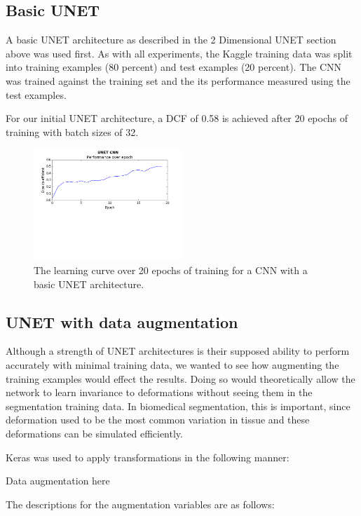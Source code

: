 \documentclass[letterpaper]{article}
\begin{document}
\subsection{Basic UNET}
A basic UNET architecture as described in the 2 Dimensional UNET section above was used first. As with all experiments, the Kaggle training data was split into training examples (80 percent) and test examples (20 percent).  The CNN was trained against the training set and the its performance measured using the test examples. 

For our initial UNET architecture, a DCF of 0.58 is achieved after 20 epochs of training with batch sizes of 32. 

 \begin{figure}[H]
  \centerline{\includegraphics[width=0.5\textwidth]{Plots/UNETSimple20.png}}
  \caption{The learning curve over 20 epochs of training for a CNN with a basic UNET architecture.}
  \label{fig:unet3}
\end{figure}

\subsection{UNET with data augmentation}

Although a strength of UNET architectures is their supposed ability to perform accurately with minimal training data, we wanted to see how augmenting the training examples would effect the results. Doing so would theoretically allow the network to learn invariance to deformations without seeing them in the segmentation training data. In biomedical segmentation, this is important, since deformation used to be the most common variation in tissue and these deformations can be simulated efficiently. 

Keras was used to apply transformations in the following manner:

Data augmentation here

The descriptions for the augmentation variables are as follows:
\end{document}
